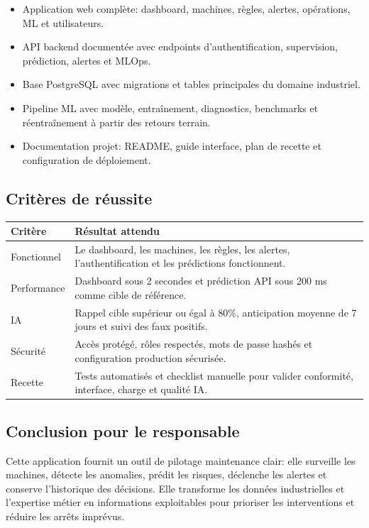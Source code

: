 \documentclass[10pt,a4paper]{article}
\begin{document}
\begin{itemize}
  \item Application web complète: dashboard, machines, règles, alertes, opérations, ML et utilisateurs.
  \item API backend documentée avec endpoints d'authentification, supervision, prédiction, alertes et MLOps.
  \item Base PostgreSQL avec migrations et tables principales du domaine industriel.
  \item Pipeline ML avec modèle, entraînement, diagnostics, benchmarks et réentraînement à partir des retours terrain.
  \item Documentation projet: README, guide interface, plan de recette et configuration de déploiement.
\end{itemize}

\subsection{Critères de réussite}

\begin{tabularx}{\textwidth}{p{4.1cm}Y}
\toprule
{}
\textbf{Critère} & \textbf{Résultat attendu} \\
\midrule
Fonctionnel & Le dashboard, les machines, les règles, les alertes, l'authentification et les prédictions fonctionnent. \\
Performance & Dashboard sous 2 secondes et prédiction API sous 200 ms comme cible de référence. \\
IA & Rappel cible supérieur ou égal à 80\%, anticipation moyenne de 7 jours et suivi des faux positifs. \\
Sécurité & Accès protégé, rôles respectés, mots de passe hashés et configuration production sécurisée. \\
Recette & Tests automatisés et checklist manuelle pour valider conformité, interface, charge et qualité IA. \\
\bottomrule
\end{tabularx}

\subsection{Conclusion pour le responsable}

Cette application fournit un outil de pilotage maintenance clair: elle surveille les machines, détecte les anomalies, prédit les risques, déclenche les alertes et conserve l'historique des décisions.
Elle transforme les données industrielles et l'expertise métier en informations exploitables pour prioriser les interventions et réduire les arrêts imprévus.
\end{document}
